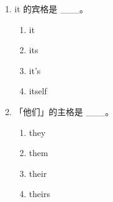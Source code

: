 \documentclass[11pt,a4paper]{ctexart}
\begin{document}
\begin{enumerate}[leftmargin=*,itemsep=4pt]
\begin{enumerate}[label=\Alph*.,leftmargin=2em,itemsep=1pt,topsep=2pt]
\item you
\item your
\item yours
\item you’s
\end{enumerate}
\item it 的宾格是 \_\_\_。
\begin{enumerate}[label=\Alph*.,leftmargin=2em,itemsep=1pt,topsep=2pt]
\item it
\item its
\item it’s
\item itself
\end{enumerate}
\item 「他们」的主格是 \_\_\_。
\begin{enumerate}[label=\Alph*.,leftmargin=2em,itemsep=1pt,topsep=2pt]
\item they
\item them
\item their
\item theirs
\end{enumerate}
\end{enumerate}
\end{document}
